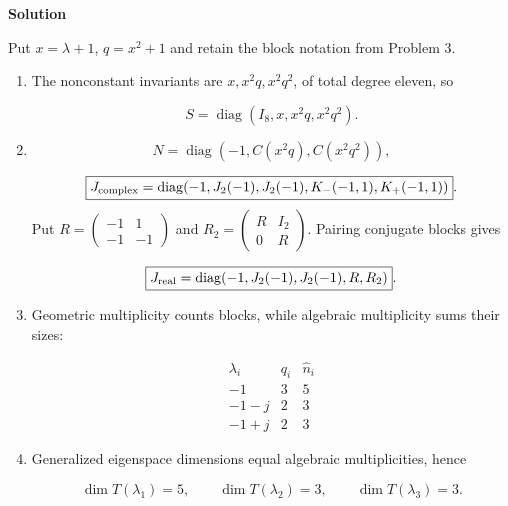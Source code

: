 \documentclass[UTF8,10pt,letterpaper,fontset=fandol]{ctexart}
\begin{document}
\par{}\textbf{Solution}\par
Put $x=\lambda+1$, $q=x^2+1$ and retain the block notation from Problem 3.

\begin{enumerate}
\item The nonconstant invariants are $x,x^2q,x^2q^2$, of total degree eleven, so

\[
\boxed{S=\operatorname{diag}(I_8,x,x^2q,x^2q^2)}.
\]

\item
\[
\boxed{N=\operatorname{diag}(-1,C(x^2q),C(x^2q^2))},
\]

\[
\boxed{J_{\rm complex}=\operatorname{diag}(-1,J_2(-1),J_2(-1),K_-(-1,1),K_+(-1,1))}.
\]
Put $R=\begin{pmatrix}-1&1\\-1&-1\end{pmatrix}$ and $R_2=\begin{pmatrix}R&I_2\\0&R\end{pmatrix}$. Pairing conjugate blocks gives

\[
\boxed{J_{\rm real}=\operatorname{diag}(-1,J_2(-1),J_2(-1),R,R_2)}.
\]

\item Geometric multiplicity counts blocks, while algebraic multiplicity sums their sizes:

\[
\begin{array}{c|cc}\lambda_i&q_i&\widehat n_i\\\hline -1&3&5\\-1-j&2&3\\-1+j&2&3\end{array}
\]

\item Generalized eigenspace dimensions equal algebraic multiplicities, hence

\[
\boxed{\dim T(\lambda_1)=5,\qquad\dim T(\lambda_2)=3,\qquad\dim T(\lambda_3)=3}.
\]

\end{enumerate}
\end{document}
